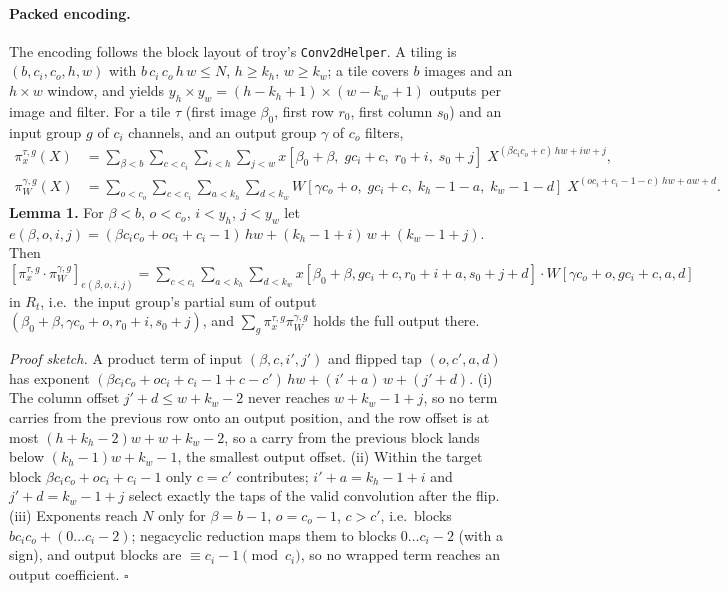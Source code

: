 \paragraph{Packed encoding.} The encoding follows the block layout of troy's \texttt{Conv2dHelper}. A tiling is
$(b, c_i, c_o, h, w)$ with $b\,c_i\,c_o\,h\,w \le N$, $h \ge k_h$, $w \ge k_w$; a tile covers $b$ images and an
$h \times w$ window, and yields $y_h \times y_w = (h - k_h + 1) \times (w - k_w + 1)$ outputs per image and filter.
For a tile $\tau$ (first image $\beta_0$, first row $r_0$, first column $s_0$) and an input group $g$ of $c_i$
channels, and an output group $\gamma$ of $c_o$ filters,
\begin{align*}
  \pi_x^{\tau,g}(X) &= \sum_{\beta<b}\sum_{c<c_i}\sum_{i<h}\sum_{j<w}
     x[\beta_0{+}\beta,\; g c_i{+}c,\; r_0{+}i,\; s_0{+}j]\; X^{(\beta c_i c_o + c)\,hw + iw + j}, \\
  \pi_W^{\gamma,g}(X) &= \sum_{o<c_o}\sum_{c<c_i}\sum_{a<k_h}\sum_{d<k_w}
     W[\gamma c_o{+}o,\; g c_i{+}c,\; k_h{-}1{-}a,\; k_w{-}1{-}d]\; X^{(o c_i + c_i - 1 - c)\,hw + aw + d}.
\end{align*}
\textbf{Lemma 1.} For $\beta < b$, $o < c_o$, $i < y_h$, $j < y_w$ let
$e(\beta,o,i,j) = (\beta c_i c_o + o c_i + c_i - 1)\,hw + (k_h - 1 + i)\,w + (k_w - 1 + j)$. Then
$[\pi_x^{\tau,g}\cdot\pi_W^{\gamma,g}]_{e(\beta,o,i,j)} =
\sum_{c<c_i}\sum_{a<k_h}\sum_{d<k_w} x[\beta_0{+}\beta, gc_i{+}c, r_0{+}i{+}a, s_0{+}j{+}d]\cdot W[\gamma c_o{+}o, gc_i{+}c, a, d]$
in $R_t$, i.e.\ the input group's partial sum of output $(\beta_0{+}\beta,\gamma c_o{+}o, r_0{+}i, s_0{+}j)$, and
$\sum_g \pi_x^{\tau,g}\pi_W^{\gamma,g}$ holds the full output there.

\emph{Proof sketch.} A product term of input $(\beta, c, i', j')$ and flipped tap $(o, c', a, d)$ has exponent
$(\beta c_i c_o + o c_i + c_i - 1 + c - c')\,hw + (i'+a)\,w + (j'+d)$. (i) The column offset $j'+d \le w + k_w - 2$
never reaches $w + k_w - 1 + j$, so no term carries from the previous row onto an output position, and the row offset
is at most $(h + k_h - 2)w + w + k_w - 2$, so a carry from the previous block lands below $(k_h-1)w + k_w - 1$, the
smallest output offset. (ii) Within the target block $\beta c_i c_o + o c_i + c_i - 1$ only $c = c'$ contributes;
$i' + a = k_h - 1 + i$ and $j' + d = k_w - 1 + j$ select exactly the taps of the valid convolution after the flip.
(iii) Exponents reach $N$ only for $\beta = b-1$, $o = c_o - 1$, $c > c'$, i.e.\ blocks $b c_i c_o + (0 \ldots c_i - 2)$;
negacyclic reduction maps them to blocks $0 \ldots c_i - 2$ (with a sign), and output blocks are $\equiv c_i - 1
\pmod{c_i}$, so no wrapped term reaches an output coefficient. \hfill$\square$

